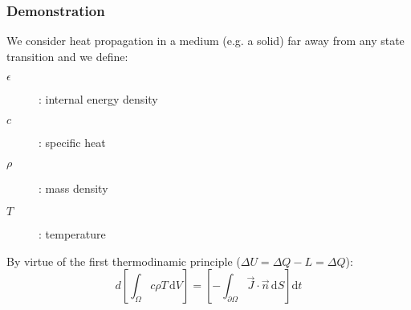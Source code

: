 \begin{frame}
\frametitle{Demonstration}
We consider heat propagation in a medium (e.g. a solid) far away from any state transition and we define:
\begin{description}
	\item[$\epsilon$]: internal energy density
	\item[$c$]: specific heat
	\item[$\rho$]: mass density
	\item[$T$]: temperature
\end{description}
By virtue of the first thermodinamic principle ($\Delta U = \Delta Q - L = \Delta Q$):
\begin{equation}\label{eq:first}
	d 
	\left[ 
		\int_\Omega 
		\! c \rho T  
		\, \mathrm{d}V
	\right]
	= 
	\left[
		- \int_{\partial \Omega} 
		\! \vec{J} \cdot \vec{n}
		\, \mathrm{d}S
	\right]
	\mathrm{d}t
\end{equation}
\end{frame}
